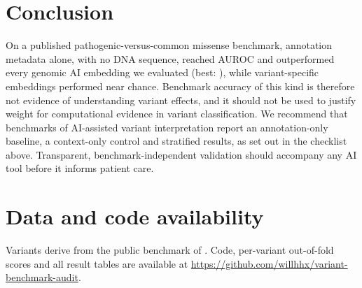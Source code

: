 \documentclass[11pt]{article}
\begin{document}
\section{Conclusion}
On a published pathogenic-versus-common missense benchmark, annotation metadata alone, with no DNA sequence, reached AUROC \MetaAll{} and outperformed every genomic AI embedding we evaluated (best: \DnbRef), while variant-specific embeddings performed near chance. Benchmark accuracy of this kind is therefore not evidence of understanding variant effects, and it should not be used to justify weight for computational evidence in variant classification. We recommend that benchmarks of AI-assisted variant interpretation report an annotation-only baseline, a context-only control and stratified results, as set out in the checklist above. Transparent, benchmark-independent validation should accompany any AI tool before it informs patient care.

\section*{Data and code availability}
Variants derive from the public benchmark of \citet{feng2025benchmark}. Code, per-variant out-of-fold scores and all result tables are available at \url{https://github.com/willhhx/variant-benchmark-audit}.


\end{document}
